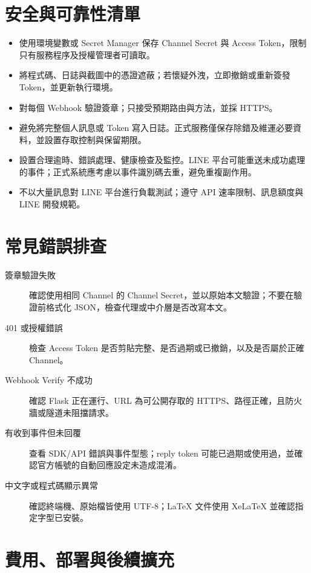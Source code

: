 \documentclass[a4paper,12pt]{report}
\begin{document}
\section{安全與可靠性清單}

\begin{itemize}
  \item 使用環境變數或 Secret Manager 保存 Channel Secret 與 Access Token，限制只有服務程序及授權管理者可讀取。
  \item 將程式碼、日誌與截圖中的憑證遮蔽；若懷疑外洩，立即撤銷或重新簽發 Token，並更新執行環境。
  \item 對每個 Webhook 驗證簽章；只接受預期路由與方法，並採 HTTPS。
  \item 避免將完整個人訊息或 Token 寫入日誌。正式服務僅保存除錯及維運必要資料，並設置存取控制與保留期限。
  \item 設置合理逾時、錯誤處理、健康檢查及監控。LINE 平台可能重送未成功處理的事件；正式系統應考慮以事件識別碼去重，避免重複副作用。
  \item 不以大量訊息對 LINE 平台進行負載測試；遵守 API 速率限制、訊息額度與 LINE 開發規範。
\end{itemize}

\section{常見錯誤排查}

\begin{description}
  \item[簽章驗證失敗] 確認使用相同 Channel 的 Channel Secret，並以原始本文驗證；不要在驗證前格式化 JSON，檢查代理或中介層是否改寫本文。
  \item[401 或授權錯誤] 檢查 Access Token 是否剪貼完整、是否過期或已撤銷，以及是否屬於正確 Channel。
  \item[Webhook Verify 不成功] 確認 Flask 正在運行、URL 為可公開存取的 HTTPS、路徑正確，且防火牆或隧道未阻擋請求。
  \item[有收到事件但未回覆] 查看 SDK/API 錯誤與事件型態；reply token 可能已過期或使用過，並確認官方帳號的自動回應設定未造成混淆。
  \item[中文字或程式碼顯示異常] 確認終端機、原始檔皆使用 UTF-8；LaTeX 文件使用 XeLaTeX 並確認指定字型已安裝。
\end{description}

\section{費用、部署與後續擴充}
\end{document}
